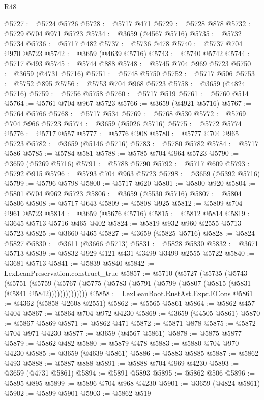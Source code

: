 \begin{lexlean}{R48}
\begin{coremodule}
@5727 := @5724 @5726
@5728 := @5717 @471
@5729 := @5728 @878
@5732 := @5729 @704 @971 @5723
@5734 := @3659 (@4567 @5716)
@5735 := @5732 @5734
@5736 := @5717 @482
@5737 := @5736 @478
@5740 := @5737 @704 @970 @5723
@5742 := @3659 (@4639 @5716)
@5743 := @5740 @5742
@5744 := @5717 @493
@5745 := @5744 @888
@5748 := @5745 @704 @969 @5723
@5750 := @3659 (@4731 @5716)
@5751 := @5748 @5750
@5752 := @5717 @506
@5753 := @5752 @895
@5756 := @5753 @704 @968 @5723
@5758 := @3659 (@4824 @5716)
@5759 := @5756 @5758
@5760 := @5717 @519
@5761 := @5760 @514
@5764 := @5761 @704 @967 @5723
@5766 := @3659 (@4921 @5716)
@5767 := @5764 @5766
@5768 := @5717 @534
@5769 := @5768 @530
@5772 := @5769 @704 @966 @5723
@5774 := @3659 (@5026 @5716)
@5775 := @5772 @5774
@5776 := @5717 @557
@5777 := @5776 @908
@5780 := @5777 @704 @965 @5723
@5782 := @3659 (@5146 @5716)
@5783 := @5780 @5782
@5784 := @5717 @586
@5785 := @5784 @581
@5788 := @5785 @704 @964 @5723
@5790 := @3659 (@5269 @5716)
@5791 := @5788 @5790
@5792 := @5717 @609
@5793 := @5792 @915
@5796 := @5793 @704 @963 @5723
@5798 := @3659 (@5392 @5716)
@5799 := @5796 @5798
@5800 := @5717 @620
@5801 := @5800 @920
@5804 := @5801 @704 @962 @5723
@5806 := @3659 (@5530 @5716)
@5807 := @5804 @5806
@5808 := @5717 @643
@5809 := @5808 @925
@5812 := @5809 @704 @961 @5723
@5814 := @3659 (@5676 @5716)
@5815 := @5812 @5814
@5819 := @3645 @5713 @5716 @465 @402
@5824 := @5819 @932 @960 @2555 @5713 @5723
@5825 := @3660 @465
@5827 := @3659 (@5825 @5716)
@5828 := @5824 @5827
@5830 := @3611 (@3666 @5713)
@5831 := @5828 @5830
@5832 := @3671 @5713
@5839 := @5832 @929 @121 @431 @3499 @3499 @2555 @5722
@5840 := @3681 @5713
@5841 := @5839 @5840
@5842 := LexLeanPreservation.construct_true
@5857 := @5710
    (@5727
      (@5735
        (@5743
          (@5751
            (@5759
              (@5767 (@5775 (@5783 (@5791 (@5799 (@5807 (@5815 (@5831 (@5841 @5842))))))))))))))
@5858 := LexLeanBoot.RustAst.Expr.ECons
@5861 := @4362 (@5858 @2608 @2551)
@5862 := @5565 @5861
@5864 := @5862 @457 @404
@5867 := @5864 @704 @972 @4230
@5869 := @3659 (@4505 @5861)
@5870 := @5867 @5869
@5871 := @5862 @471
@5872 := @5871 @878
@5875 := @5872 @704 @971 @4230
@5877 := @3659 (@4567 @5861)
@5878 := @5875 @5877
@5879 := @5862 @482
@5880 := @5879 @478
@5883 := @5880 @704 @970 @4230
@5885 := @3659 (@4639 @5861)
@5886 := @5883 @5885
@5887 := @5862 @493
@5888 := @5887 @888
@5891 := @5888 @704 @969 @4230
@5893 := @3659 (@4731 @5861)
@5894 := @5891 @5893
@5895 := @5862 @506
@5896 := @5895 @895
@5899 := @5896 @704 @968 @4230
@5901 := @3659 (@4824 @5861)
@5902 := @5899 @5901
@5903 := @5862 @519

\end{coremodule}
\end{lexlean}
